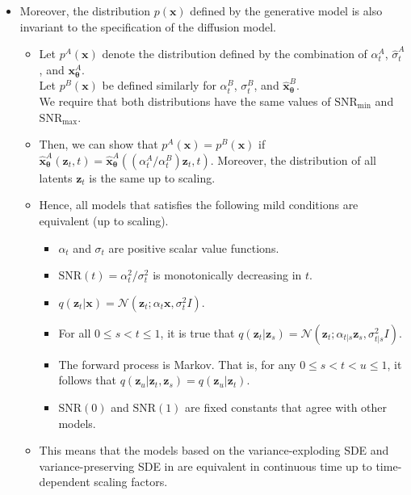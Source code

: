 \documentclass[10pt]{article}
\newcommand{\ve}[1]{\mathbf{#1}}
\newcommand{\ves}[1]{\boldsymbol{#1}}
\newcommand{\N}{\mathcal{N}}
\newcommand{\SNR}{\mathrm{SNR}}
\begin{document}
\begin{itemize}
  \item Moreover, the distribution $p(\ve{x})$ defined by the generative model is also invariant to the specification of the diffusion model.
  \begin{itemize}
    \item Let $p^A(\ve{x})$ denote the distribution defined by the combination of $\alpha_t^A$, $\hat{\sigma}_t^A$, and $\ve{x}_{\ves{\theta}}^A$. \\
    Let $p^B(\ve{x})$ be defined similarly for $\alpha_t^B$, $\sigma_t^B$, and $\hat{\ve{x}}_{\ves{\theta}}^B$.\\
    We require that both distributions have the same values of $\SNR_{\min}$ and $\SNR_{\max}$.

    \item Then, we can show that $p^A(\ve{x}) = p^B(\ve{x})$ if $\hat{\ve{x}}_{\ves{\theta}}^A(\ve{z}_t, t) = \hat{\ve{x}}^A_{\ves{\theta}}((\alpha^A_t/\alpha_t^B)\ve{z}_t, t)$. Moreover, the distribution of all latents $\ve{z}_t$ is the same up to scaling.

    \item Hence, all models that satisfies the following mild conditions are equivalent (up to scaling).
    \begin{itemize}
      \item $\alpha_t$ and $\sigma_t$ are positive scalar value functions.
      \item $\SNR(t) = \alpha_t^2 / \sigma_t^2$ is monotonically decreasing in $t$.
      \item $q(\ve{z}_t|\ve{x}) = \N(\ve{z}_t; \alpha_t \ve{x}, \sigma_t^2 I)$.
      \item For all $0 \leq s < t \leq 1$, it is true that $q(\ve{z}_t|\ve{z}_s) = \N(\ve{z}_t; \alpha_{t|s}\ve{z}_s, \sigma^2_{t|s} I)$.
      \item The forward process is Markov. That is, for any $0 \leq s < t < u \leq 1$, it follows that $q(\ve{z}_u|\ve{z}_t, \ve{z}_s) = q(\ve{z}_u|\ve{z}_t)$.
      \item $\SNR(0)$ and $\SNR(1)$ are fixed constants that agree with other models.
    \end{itemize}
    
    \item This means that the models based on the variance-exploding SDE and variance-preserving SDE in \cite{Song:2020:SDE} are equivalent in continuous time up to time-dependent scaling factors.
  \end{itemize}  


\end{itemize}
\end{document}

